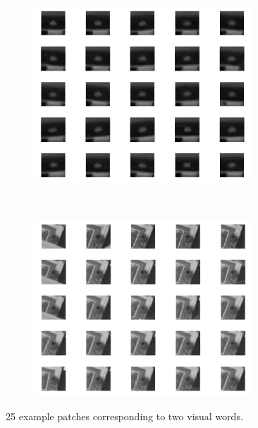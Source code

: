 \documentclass{paper}
\begin{document}
\begin{figure}[h!]
    \centering
    \begin{subfigure}[]{0.5\textwidth}
        \centering
        \includegraphics[width=0.9\textwidth]{examplesWord1.png}
    \end{subfigure}%
    ~ 
    \begin{subfigure}[]{0.5\textwidth}
        \centering
        \includegraphics[width=0.9\textwidth]{examplesWord3.png}
    \end{subfigure}
    \caption{25 example patches corresponding to two visual words.}
\label{fig:vocab}
\end{figure}
\end{document}
